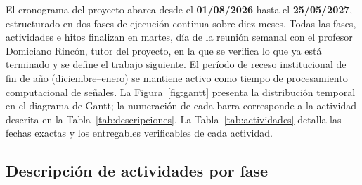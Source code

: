 \documentclass[12pt,a4paper]{article}
\begin{document}
El cronograma del proyecto abarca desde el \textbf{01/08/2026} hasta el \textbf{25/05/2027}, estructurado en dos fases de ejecución continua sobre diez meses. Todas las fases, actividades e hitos finalizan en martes, día de la reunión semanal con el profesor Domiciano Rincón, tutor del proyecto, en la que se verifica lo que ya está terminado y se define el trabajo siguiente. El período de receso institucional de fin de año (diciembre--enero) se mantiene activo como tiempo de procesamiento computacional de señales. La Figura~\ref{fig:gantt} presenta la distribución temporal en el diagrama de Gantt; la numeración de cada barra corresponde a la actividad descrita en la Tabla~\ref{tab:descripciones}. La Tabla~\ref{tab:actividades} detalla las fechas exactas y los entregables verificables de cada actividad.

\subsection*{Descripción de actividades por fase}
\label{sec:desc-actividades}
\end{document}
